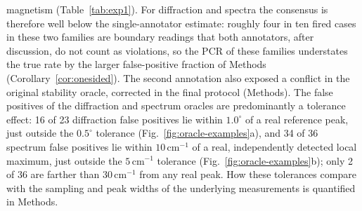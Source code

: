 \documentclass[pdflatex,sn-nature]{sn-jnl}
\providecommand{\DIFaddend}{} %
\DeclareRobustCommand{\DIFaddend}{\DIFOaddend \let\includegraphics\DIFOincludegraphics} %
\begin{document}
{{magnetism (Table~\ref{tab:exp1}). For diffraction and spectra the consensus is therefore well below the
single-annotator estimate: roughly four in ten fired cases in these two families are boundary readings that
both annotators, after discussion, do not count as violations, so the PCR of these families understates the
true rate by the larger false-positive fraction of Methods (Corollary~\ref{cor:onesided}). The second annotation also exposed a conflict in
the original stability oracle, corrected in the final protocol (Methods). The false positives of the diffraction and spectrum oracles
are predominantly a tolerance effect: 16 of 23 diffraction false positives lie within
$1.0^\circ$ of a real reference peak, just outside the $0.5^\circ$ tolerance
(Fig.~\ref{fig:oracle-examples}a), and 34 of 36 spectrum false positives lie within
$10\,\mathrm{cm}^{-1}$ of a real, independently detected local maximum, just outside the
$5\,\mathrm{cm}^{-1}$ tolerance (Fig.~\ref{fig:oracle-examples}b); only 2 of 36 are farther than
$30\,\mathrm{cm}^{-1}$ from any real peak. How these tolerances compare with the sampling and
peak widths of the underlying measurements is quantified in Methods.}
}\DIFaddend 


\end{document}
